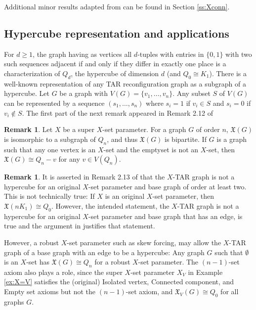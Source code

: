 \documentclass{article}
\numberwithin{figure}{section}
\numberwithin{table}{section}
\numberwithin{equation}{section}
\theoremstyle{definition}
\newtheorem{rem}[thm]{Remark}
\theoremstyle{definition}
\theoremstyle{definition}
\newcommand{\xtar}{\mathfrak{X}}%
\begin{document}
{Additional minor results adapted  from \cite{PDrecon} can be found in Section \ref{ss:Xconn}.
\subsection{Hypercube representation and applications}

 For $
  d\ge 1$, the graph having   as vertices  all  $d$-tuples with entries in $\{0,1\}$ with two such sequences adjacent  if and only if  they differ in exactly one place is a characterization of $Q_d$, the hypercube of dimension $d$  (and $Q_0\cong K_1$). There is a well-known representation of any TAR reconfiguration graph as a subgraph of a hypercube.  Let $G$ be a graph with $ V(G)=\{v_1,\dots,v_n\}$. Any subset $S$ of $V(G)$ can be represented by a sequence $(s_1, \dots, s_n)$ where $s_i=1$ if $v_i\in S$ and $s_i=0$ if $v_i\not\in S$.     The first part of the next remark appeared in Remark 2.12 of \cite{PDrecon}


\begin{rem}\label{r:hypercube-bip} Let $X$ be a super $X$-set parameter. For a graph $G$ of order $n$, $\xtar(G)$ is isomorphic to a subgraph of $Q_n$, and thus $\xtar(G)$ is bipartite. If $G$ is a graph such that  any one vertex is an $X$-set and the emptyset is not an $X$-set, then    $\xtar(G)\cong Q_n-v$ for any $v\in V(Q_n)$.  
\end{rem}




\begin{rem}\label{r:noQn}    It is asserted in Remark 2.13 of \cite{PDrecon} that the $X$-TAR graph is not a hypercube for an original  $X$-set parameter and base graph of order at least two. This is not technically true: If $X$ is  an original $X$-set parameter, then $\xtar(nK_1)\cong Q_0$.  However, the intended statement,  the $X$-TAR graph is not a hypercube for an original  $X$-set parameter and base graph that has an edge, is true and the argument in \cite[Remark 2.13]{PDrecon} justifies that statement.

 However, a robust $X$-set parameter such as skew forcing, may allow the $X$-TAR graph of a base graph with an edge to be a hypercube: Any graph $G$ such that  $\emptyset$ is an $X$-set has $\xtar(G)\cong Q_n$ for a robust $X$-set parameter.   The $(n-1)$-set  axiom also plays a role, since the super $X$-set parameter $X_V$ in Example \ref{ex:X=V} satisfies the  (original) Isolated vertex, Connected component, and Empty set axioms but not the $(n-1)$-set  axiom, and $\xtar_V(G)\cong Q_0$ for all graphs $G$.
 \end{rem}

}
\end{document}
